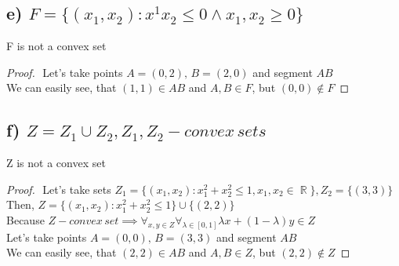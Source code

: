 \documentclass[12pt]{article}
\DeclareMathOperator{\R}{\mathbb{R}}
\begin{document}
\subsection*{e) \( F=\{(x_1, x_2):x^1 x_2\leq 0 \land x_1, x_2\geq 0\}\)}
F is not a convex set
\begin{proof}
    $ $\newline
    Let's take points \(A=(0,2), \, B=(2,0)\) and segment \(AB\)\\
    We can easily see, that \((1,1) \in AB\) and \( A, B \in F\), but \( (0,0)\notin F\)
\end{proof}
\subsection*{f) \(Z=Z_1 \cup Z_2, Z_1, Z_2-convex\,sets\)}
Z is not a convex set
\begin{proof}
    $ $\newline
    Let's take sets \( Z_1=\{(x_1, x_2):x_1^2+x_2^2\leq 1, x_1, x_2 \in \R\}, Z_2=\{(3, 3)\} \)\\
    Then, \(Z=\{(x_1, x_2):x_1^2+x_2^2\leq 1\}\cup \{(2, 2)\}\)\\
    Because \(Z-convex\,set \implies \forall_{x, y \in Z} \forall_{\lambda \in [0,1]} \lambda x+(1-\lambda)y \in Z\)\\
    Let's take points \(A=(0,0), \, B=(3, 3)\) and segment \(AB\)\\
    We can easily see, that \((2,2) \in AB\) and \( A, B \in Z\), but \( (2,2)\notin Z\)
\end{proof}
\end{document}
